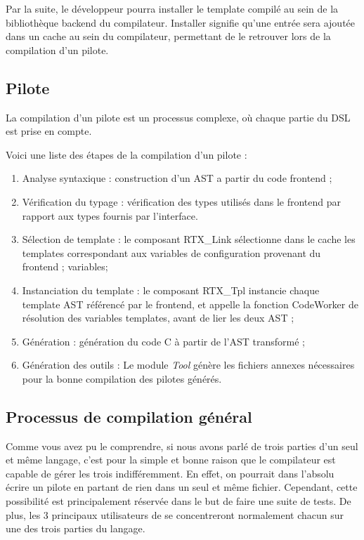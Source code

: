 \documentclass[french]{rtxreport}
\begin{document}
Par la suite, le développeur pourra installer le template compilé au sein de la
bibliothèque backend du compilateur. Installer signifie qu'une entrée sera
ajoutée dans un cache au sein du compilateur, permettant de le retrouver lors
de la compilation d'un pilote.


\subsection{Pilote}
\label{sec:driverCompilation}

La compilation d'un pilote est un processus complexe, où chaque partie du DSL
est prise en compte.

Voici une liste des étapes de la compilation d'un pilote :
\begin{enumerate}
    \item Analyse syntaxique : construction d'un AST a partir du code frontend ;
    \item Vérification du typage : vérification des types utilisés dans le
        frontend par rapport aux types fournis par l'interface.
    \item Sélection de template : le composant RTX\_Link sélectionne dans le
        cache les templates correspondant aux variables de configuration
        provenant du frontend ; variables;
    \item Instanciation du template : le composant RTX\_Tpl instancie chaque
        template AST référencé par le frontend, et appelle la fonction
        CodeWorker de résolution des variables templates, avant de lier les
        deux AST ;
    \item Génération : génération du code C à partir de l'AST transformé ;
    \item Génération des outils : Le module \emph{Tool} génère les fichiers
        annexes nécessaires pour la bonne compilation des pilotes générés.
\end{enumerate}


\subsection{Processus de compilation général}

Comme vous avez pu le comprendre, si nous avons parlé de trois parties d'un
seul et même langage, c'est pour la simple et bonne raison que le compilateur
est capable de gérer les trois indifféremment. En effet, on pourrait dans
l'absolu écrire un pilote en partant de rien dans un seul et même fichier.
Cependant, cette possibilité est principalement réservée dans le but de faire
une suite de tests. De plus, les 3 principaux utilisateurs de \rtx se
concentreront normalement chacun sur une des trois parties du langage.
\end{document}
